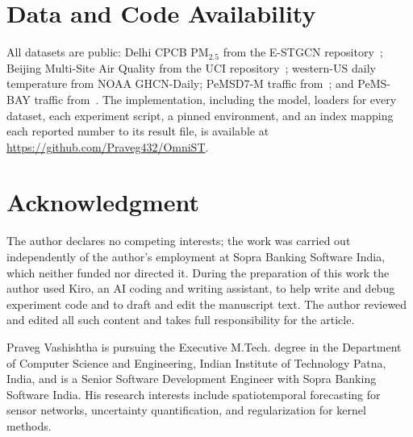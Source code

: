\documentclass[journal,twoside,web]{ieeecolor}
\newcommand{\repourl}{https://github.com/Praveg432/OmniST}
\begin{document}
\section*{Data and Code Availability}
All datasets are public: Delhi CPCB PM$_{2.5}$ from the E-STGCN repository~\cite{panja2026estgcn};
Beijing Multi-Site Air Quality from the UCI repository~\cite{zhang2017beijingair}; western-US daily
temperature from NOAA GHCN-Daily; PeMSD7-M traffic from~\cite{yu2018stgcn}; and PeMS-BAY traffic
from~\cite{li2018dcrnn}. The implementation, including the model, loaders for every dataset, each
experiment script, a pinned environment, and an index mapping each reported number to its result
file, is available at \url{\repourl}.

\section*{Acknowledgment}
The author declares no competing interests; the work was carried out
independently of the author's employment at Sopra Banking Software India, which neither funded nor
directed it. During the preparation of this work the author used Kiro, an AI coding and writing
assistant, to help write and debug experiment code and to draft and edit the manuscript text. The
author reviewed and edited all such content and takes full responsibility for the article.




\begin{IEEEbiographynophoto}{Praveg Vashishtha}
is pursuing the Executive M.Tech. degree in the Department of Computer Science and Engineering,
Indian Institute of Technology Patna, India, and is a Senior Software Development Engineer with Sopra
Banking Software India. His research interests include spatiotemporal forecasting for sensor
networks, uncertainty quantification, and regularization for kernel methods.
\end{IEEEbiographynophoto}
\end{document}
